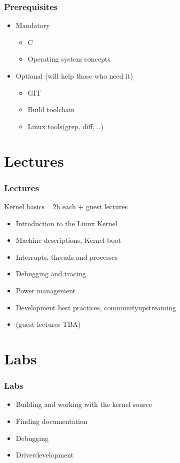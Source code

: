 \documentclass{beamer}
\begin{document}
\begin{frame}
\frametitle{Prerequisites}
\begin{itemize}
	\item Mandatory
	\begin{itemize}
		\item C
		\item Operating system concepts
	\end{itemize}

	\item Optional (will help those who need it)
	\begin{itemize}
		\item GIT
		\item Build toolchain
		\item Linux tools(grep, diff, ..)
	\end{itemize}
\end{itemize}
\end{frame}

\section{Lectures}
\begin{frame}
\frametitle{Lectures}
Kernel basics ~ 2h each + guest lectures
\begin{itemize}
	\item Introduction to the Linux Kernel	
	\item Machine descriptions, Kernel boot
	\item Interrupts, threads and processes
	\item Debugging and tracing 
	\item Power management
	\item Development best practices, communityupstreaming
	\item (guest lectures TBA)
\end{itemize}
\end{frame}

\section{Labs}
\begin{frame}
\frametitle{Labs}
\begin{itemize}
	\item Building and working with the kernel source
	\item Finding documentation
	\item Debugging
	\item Driverdevelopment 
\end{itemize} 
\end{frame}
\end{document}
